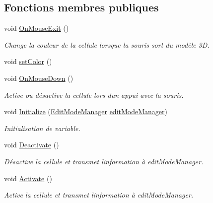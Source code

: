 \subsection*{Fonctions membres publiques}
\begin{DoxyCompactItemize}
\item 
void \mbox{\hyperlink{class_edit_mode_cell_ad4e948c25ee58224ae23fa3288c4f2a1}{On\+Mouse\+Exit}} ()
\begin{DoxyCompactList}\small\item\em Change la couleur de la cellule lorsque la souris sort du modèle 3D. \end{DoxyCompactList}\item 
void \mbox{\hyperlink{class_edit_mode_cell_a38e231f9ad9dbee905d575660b77cfe2}{set\+Color}} ()
\item 
void \mbox{\hyperlink{class_edit_mode_cell_a692f6272d4ef7a51092aef52a599233d}{On\+Mouse\+Down}} ()
\begin{DoxyCompactList}\small\item\em Active ou désactive la cellule lors d\textquotesingle{}un appui avec la souris. \end{DoxyCompactList}\item 
void \mbox{\hyperlink{class_edit_mode_cell_a85064e1ba44195ce0a8fa8c66f8e5ffa}{Initialize}} (\mbox{\hyperlink{class_edit_mode_manager}{Edit\+Mode\+Manager}} \mbox{\hyperlink{class_edit_mode_cell_ae252461bd35c4e41657659411196652e}{edit\+Mode\+Manager}})
\begin{DoxyCompactList}\small\item\em Initialisation de variable. \end{DoxyCompactList}\item 
void \mbox{\hyperlink{class_edit_mode_cell_a972bc99f957f4a37dcd482162e9762c8}{Deactivate}} ()
\begin{DoxyCompactList}\small\item\em Désactive la cellule et transmet l\textquotesingle{}information à edit\+Mode\+Manager. \end{DoxyCompactList}\item 
void \mbox{\hyperlink{class_edit_mode_cell_ab29acfb84a03e3d04805cb16ba5b4af8}{Activate}} ()
\begin{DoxyCompactList}\small\item\em Active la cellule et transmet l\textquotesingle{}information à edit\+Mode\+Manager. \end{DoxyCompactList}\end{DoxyCompactItemize}
